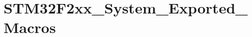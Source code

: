 \hypertarget{group___s_t_m32_f2xx___system___exported___macros}{\section{S\-T\-M32\-F2xx\-\_\-\-System\-\_\-\-Exported\-\_\-\-Macros}
\label{group___s_t_m32_f2xx___system___exported___macros}
}
